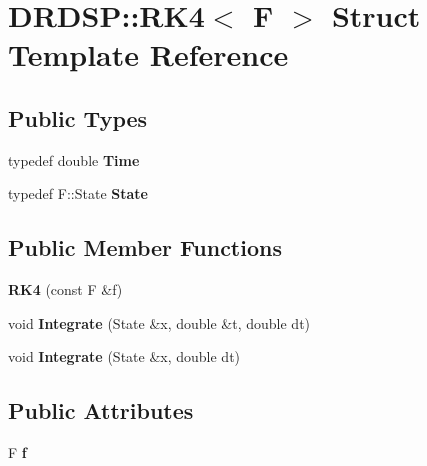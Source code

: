 \hypertarget{struct_d_r_d_s_p_1_1_r_k4}{\section{D\-R\-D\-S\-P\-:\-:R\-K4$<$ F $>$ Struct Template Reference}
\label{struct_d_r_d_s_p_1_1_r_k4}
}
\subsection*{Public Types}
\begin{DoxyCompactItemize}
\item 
\hypertarget{struct_d_r_d_s_p_1_1_r_k4_ade135f12d4119a53c7d7282b0a9de553}{typedef double {\bfseries Time}}\label{struct_d_r_d_s_p_1_1_r_k4_ade135f12d4119a53c7d7282b0a9de553}

\item 
\hypertarget{struct_d_r_d_s_p_1_1_r_k4_a4061ef12d7d212db4d346233710d13f3}{typedef F\-::\-State {\bfseries State}}\label{struct_d_r_d_s_p_1_1_r_k4_a4061ef12d7d212db4d346233710d13f3}

\end{DoxyCompactItemize}
\subsection*{Public Member Functions}
\begin{DoxyCompactItemize}
\item 
\hypertarget{struct_d_r_d_s_p_1_1_r_k4_a7091cac412735b28b5232d2df123e94a}{{\bfseries R\-K4} (const F \&f)}\label{struct_d_r_d_s_p_1_1_r_k4_a7091cac412735b28b5232d2df123e94a}

\item 
\hypertarget{struct_d_r_d_s_p_1_1_r_k4_a16d39b0b28cce9a7cd3e60ba51f36440}{void {\bfseries Integrate} (State \&x, double \&t, double dt)}\label{struct_d_r_d_s_p_1_1_r_k4_a16d39b0b28cce9a7cd3e60ba51f36440}

\item 
\hypertarget{struct_d_r_d_s_p_1_1_r_k4_aba50885ae1bae99d504e1663d0f286f9}{void {\bfseries Integrate} (State \&x, double dt)}\label{struct_d_r_d_s_p_1_1_r_k4_aba50885ae1bae99d504e1663d0f286f9}

\end{DoxyCompactItemize}
\subsection*{Public Attributes}
\begin{DoxyCompactItemize}
\item 
\hypertarget{struct_d_r_d_s_p_1_1_r_k4_af75b6d95493eb7e76dcdcc8bce7946b9}{F {\bfseries f}}\label{struct_d_r_d_s_p_1_1_r_k4_af75b6d95493eb7e76dcdcc8bce7946b9}

\end{DoxyCompactItemize}
